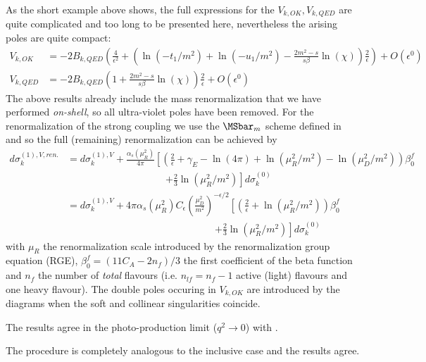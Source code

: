 As the short example above shows, the full expressions for the $V_{k,OK},V_{k,QED}$ are quite complicated and too long to be presented here, nevertheless the arising poles are quite compact:
\begin{align}
V_{k,OK} &= -2B_{k,QED}\left(\frac 4 {\epsilon^2} + \left(\ln(-t_1/m^2) + \ln(-u_1/m^2) -\frac{2m^2-s}{s\beta}\ln(\chi)\right)\frac 2 \epsilon \right) + O(\epsilon^0)\\
V_{k,QED} &= -2B_{k,QED}\left(1+\frac{2m^2-s}{s\beta}\ln(\chi)\right)\frac 2 \epsilon + O(\epsilon^0)
\end{align}
The above results already include the mass renormalization that we have performed \textit{on-shell}, so all ultra-violet poles have been removed. For the renormalization of the strong coupling we use the $\MSbar_m$ scheme defined in \cite{Bojak:2000eu} and so the full (remaining) renormalization can be achieved by
\begin{align}
d\sigma_{k}^{(1),V,ren.} &=d\sigma_{k}^{(1),V} + \frac{\alpha_s(\mu_R^2)}{4\pi}\left[\left(\frac 2 \epsilon + \gamma_E-\ln(4\pi)+\ln(\mu_R^2/m^2)-\ln(\mu_D^2/m^2)\right)\beta_0^f \right.\nonumber\\
 &\hspace{120pt}\left.+\frac 2 3 \ln(\mu_R^2/m^2)\right] d\sigma_{k}^{(0)}\\
&=d\sigma_{k}^{(1),V} + 4\pi\alpha_s(\mu_R^2)C_\epsilon\left(\frac{\mu_D^2}{m^2}\right)^{-\epsilon/2}\left[\left(\frac 2 \epsilon +\ln(\mu_R^2/m^2)\right)\beta_0^f \right.\nonumber\\
 &\hspace{180pt}\left.+\frac 2 3 \ln(\mu_R^2/m^2)\right]d\sigma_{k}^{(0)}
\end{align}
with $\mu_R$ the renormalization scale introduced by the renormalization group equation (RGE), $\beta_0^f = (11C_A- 2n_{f})/3$ the first coefficient of the beta function and $n_f$ the number of \textit{total} flavours (i.e. $n_{lf}=n_f-1$ active (light) flavours and one heavy flavour). The double poles occuring in $V_{k,OK}$ are introduced by the diagrams  when the soft and collinear singularities coincide.

The results agree in the photo-production limit ($q^2\rightarrow 0$) with \cite{Bojak:1998zm} .

The procedure is completely analogous to the inclusive case \cite{Laenen1993162} and the results agree.
